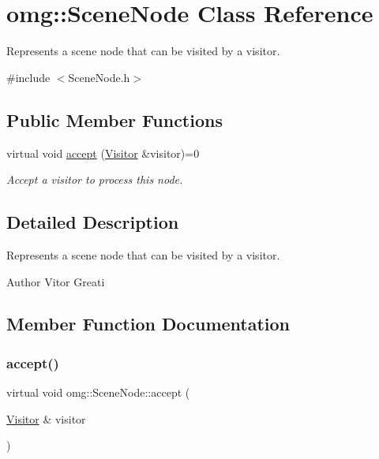 \hypertarget{classomg_1_1_scene_node}{}\section{omg\+::Scene\+Node Class Reference}
\label{classomg_1_1_scene_node}


Represents a scene node that can be visited by a visitor.  




{\ttfamily \#include $<$Scene\+Node.\+h$>$}

\subsection*{Public Member Functions}
\begin{DoxyCompactItemize}
\item 
virtual void \mbox{\hyperlink{classomg_1_1_scene_node_ad8e1595d15c4b92ab505828a0633a4d9}{accept}} (\mbox{\hyperlink{classomg_1_1_visitor}{Visitor}} \&visitor)=0
\begin{DoxyCompactList}\small\item\em Accept a visitor to process this node. \end{DoxyCompactList}\end{DoxyCompactItemize}


\subsection{Detailed Description}
Represents a scene node that can be visited by a visitor. 

\begin{DoxyAuthor}{Author}
Vitor Greati 
\end{DoxyAuthor}


\subsection{Member Function Documentation}
\mbox{\label{classomg_1_1_scene_node_ad8e1595d15c4b92ab505828a0633a4d9}} 
\subsubsection{\texorpdfstring{accept()}{accept()}}
{\footnotesize\ttfamily virtual void omg\+::\+Scene\+Node\+::accept (\begin{DoxyParamCaption}\item[{\mbox{\hyperlink{classomg_1_1_visitor}{Visitor}} \&}]{visitor }\end{DoxyParamCaption})\hspace{0.3cm}{\ttfamily [pure virtual]}}




